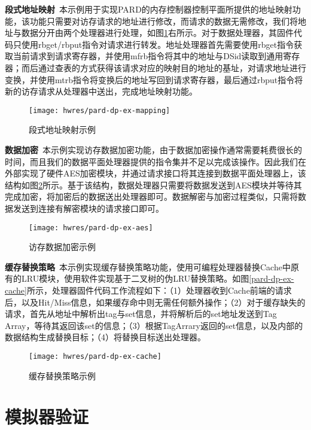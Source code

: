 \textbf{段式地址映射}\ 本示例用于实现PARD的内存控制器控制平面所提供的地址映射功能，该功能只需要对访存请求的地址进行修改，而请求的数据无需修改，我们将地址与数据分开由两个处理器进行处理，如图\ref{fig:pard-dp-ex-mapping}右所示。对于数据处理器，其固件代码只使用rbget/rbput指令对请求进行转发。地址处理器首先需要使用rbget指令获取当前请求到请求寄存器，并使用mfrb指令将其中的地址与DSid读取到通用寄存器；而后通过查表的方式获得该请求对应的映射目的地址的基址，对请求地址进行变换，并使用mtrb指令将变换后的地址写回到请求寄存器，最后通过rbput指令将新的访存请求从处理器中送出，完成地址映射功能。

\begin{figure}[H]
  \centering
  \texttt{[image: hwres/pard-dp-ex-mapping]}
  \caption{段式地址映射示例}
  \label{fig:pard-dp-ex-mapping}
\end{figure}
 
\textbf{数据加密}\ 本示例实现访存数据加密功能，由于数据加密操作通常需要耗费很长的时间，而且我们的数据平面处理器提供的指令集并不足以完成该操作。因此我们在外部实现了硬件AES加密模块，并通过请求接口将其连接到数据平面处理器上，该结构如图\ref{fig:pard-dp-ex-aes}所示。基于该结构，数据处理器只需要将数据发送到AES模块并等待其完成加密，将加密后的数据送出处理器即可。数据解密与加密过程类似，只需将数据发送到连接有解密模块的请求接口即可。

\begin{figure}[H]
  \centering
  \texttt{[image: hwres/pard-dp-ex-aes]}
  \caption{访存数据加密示例}
  \label{fig:pard-dp-ex-aes}
\end{figure}
 
\textbf{缓存替换策略}\ 本示例实现缓存替换策略功能，使用可编程处理器替换Cache中原有的LRU模块，使用软件实现基于二叉树的伪LRU替换策略。如图\ref{pard-dp-ex-cache}所示，处理器固件代码工作流程如下：（1）处理器收到Cache前端的请求后，以及Hit/Miss信息，如果缓存命中则无需任何额外操作；（2）对于缓存缺失的请求，首先从地址中解析出tag与set信息，并将解析后的set地址发送到Tag Array，等待其返回该set的信息；（3）根据TagArrary返回的set信息，以及内部的数据结构生成替换目标；（4）将替换目标送出处理器。

\begin{figure}[H]
  \centering
  \texttt{[image: hwres/pard-dp-ex-cache]}
  \caption{缓存替换策略示例}
  \label{fig:pard-dp-ex-cache}
\end{figure}


\section{模拟器验证}


